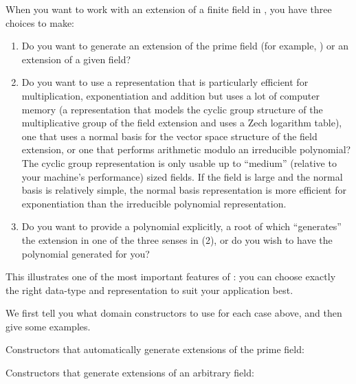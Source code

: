 {{{{{{{{{{{{{{{{%

When you want to work with an extension of a finite field in \Language{},
you have three choices to make:
\begin{enumerate}
\item Do you want to generate an extension of the prime field
(for example, ) or an extension of a given field?
%
\item Do you want to use a representation that is particularly
efficient for multiplication, exponentiation and addition but
uses a lot of computer memory (a representation that models the cyclic
group structure of the multiplicative group of the field extension
and uses a Zech logarithm table),  one that
uses a normal basis for the vector space structure of the field
extension, or one that performs arithmetic modulo an irreducible
polynomial?
The cyclic group representation is only usable up to ``medium''
(relative to your machine's performance)
sized fields.
If the field is large and the normal basis is relatively simple,
the normal basis representation is more efficient for exponentiation than
the irreducible polynomial representation.
%
\item Do you want to provide a polynomial explicitly, a root of which
``generates'' the extension in one of the three senses in (2),
or do you wish to have the polynomial generated for you?
\end{enumerate}

This illustrates one of the most important features of \Language{}:
you can choose exactly the right data-type and representation to
suit your application best.

We first tell you what domain constructors to use for each case
above, and then give some examples.

\hangindent=2pc
Constructors that automatically generate extensions of the prime field:
\newline
{} \newline
{} \newline
{}

\hangindent=2pc
Constructors that generate extensions of an arbitrary field:
\newline
{} \newline
{} \newline
{} \newline
{} \newline
{} \newline
{}

}}}}}}}}}}}}}}}}
